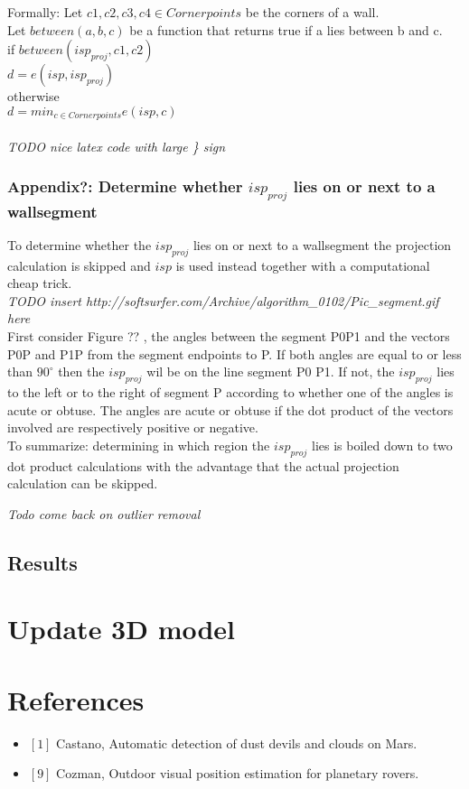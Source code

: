 \documentclass[10pt]{article}
\begin{document}
Formally:
Let $c1,c2,c3,c4 \in Cornerpoints$ be the corners of a wall.\\
Let $between(a,b,c)$ be a function that returns true if a lies between b and c.\\
if $between(isp_{proj}, c1, c2)$\\
$d = e(isp, isp_{proj})$\\
otherwise\\
$d = min_{c \in Cornerpoints} e(isp, c)$\\
\\
\textit{TODO nice latex code with large \} sign}\\


\subsubsection{Appendix?: Determine whether $isp_{proj}$ lies on or next to a wallsegment}



To determine whether the $isp_{proj}$ lies on or next to a wallsegment the
projection calculation is skipped and $isp$ is used instead together with a
computational cheap trick.\\


\textit{ TODO insert http://softsurfer.com/Archive/algorithm\_0102/Pic\_segment.gif here}\\
First consider Figure ?? , the angles between the segment P0P1 and the vectors P0P and P1P
from the segment endpoints to P. If both angles are equal to or less than
$90^{\circ}$ then the $isp_{proj}$ wil be on the line segment P0 P1.  If not,
the $isp_{proj}$ lies to the left or to the right of segment P according to
whether one of the angles is acute or obtuse.  The angles are acute or obtuse
if the dot product of the vectors involved are respectively positive or
	negative.\\
To summarize: determining in which region the $isp_{proj}$ lies is boiled down to
two dot product calculations with the advantage that the actual projection
calculation can be skipped.


\textit{Todo come back on outlier removal}
\subsection{Results}

\section{Update 3D model}


\section{References}
\begin{itemize}
\item $[1]$ Castano, Automatic detection of dust devils and clouds on Mars.
\item $[9]$ Cozman, Outdoor visual position estimation for planetary rovers.
\end{itemize}
\end{document}
